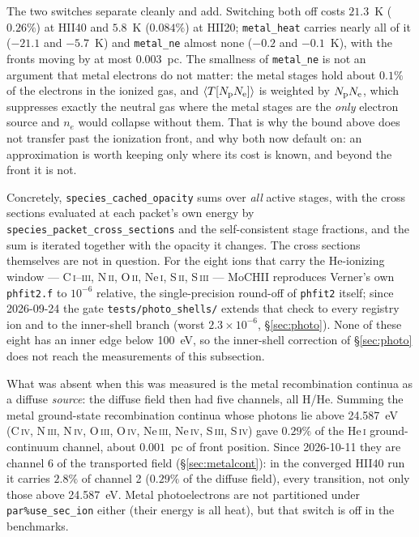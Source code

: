\documentclass[english,a4paper]{my_memo}
\newcommand{\code}[1]{\texttt{#1}}
\begin{document}
The two switches separate cleanly and add.  Switching both off costs
$21.3$~K ($0.26\%$) at HII40 and $5.8$~K ($0.084\%$) at HII20;
\code{metal\_heat} carries nearly all of it ($-21.1$ and $-5.7$~K) and
\code{metal\_ne} almost none ($-0.2$ and $-0.1$~K), with the fronts moving by
at most $0.003$~pc.  The smallness of \code{metal\_ne} is not an argument that
metal electrons do not matter: the metal stages hold about $0.1\%$ of the
electrons in the ionized gas, and $\langle T[N_{\rm p}N_{\rm e}]\rangle$ is
weighted by $N_{\rm p}N_{\rm e}$, which suppresses exactly the neutral gas
where the metal stages are the \emph{only} electron source and $n_e$ would
collapse without them.  That is why the bound above does not transfer past the
ionization front, and why both now default on: an approximation is worth
keeping only where its cost is known, and beyond the front it is not.

Concretely, \code{species\_cached\_opacity} sums over \emph{all}
active stages, with the cross sections evaluated at each packet's own energy
by \code{species\_packet\_cross\_sections} and the self-consistent stage
fractions, and the sum is iterated together with the opacity it changes.
The cross sections themselves are not in question.  For the eight ions that
carry the He-ionizing window --- C\,\textsc{i}--\textsc{iii},
N\,\textsc{ii}, O\,\textsc{ii}, Ne\,\textsc{i}, S\,\textsc{ii},
S\,\textsc{iii} --- MoCHII reproduces Verner's own \code{phfit2.f} to
$10^{-6}$ relative, the single-precision round-off of \code{phfit2} itself;
since 2026-09-24 the gate \code{tests/photo\_shells/} extends that check to
every registry ion and to the inner-shell branch (worst
$2.3{\times}10^{-6}$, \S\ref{sec:photo}).  None of these eight has an inner
edge below 100~eV, so the inner-shell correction of \S\ref{sec:photo} does
not reach the measurements of this subsection.

What was absent when this was measured is the metal recombination
continua as a diffuse \emph{source}: the diffuse field then had five
channels, all H/He.  Summing the metal ground-state recombination continua
whose photons lie above 24.587~eV (C\,\textsc{iv}, N\,\textsc{iii},
N\,\textsc{iv}, O\,\textsc{iii}, O\,\textsc{iv}, Ne\,\textsc{iii},
Ne\,\textsc{iv}, S\,\textsc{iii}, S\,\textsc{iv}) gave $0.29\%$ of the
He\,\textsc{i} ground-continuum channel, about $0.001$~pc of front
position.  Since 2026-10-11 they are channel 6 of the transported field
(\S\ref{sec:metalcont}): in the converged HII40 run it carries $2.8\%$ of
channel 2 ($0.29\%$ of the diffuse field), every transition, not only
those above 24.587~eV.  Metal photoelectrons are not
partitioned under \code{par\%use\_sec\_ion} either (their energy is all
heat), but that switch is off in the benchmarks.
\end{document}

